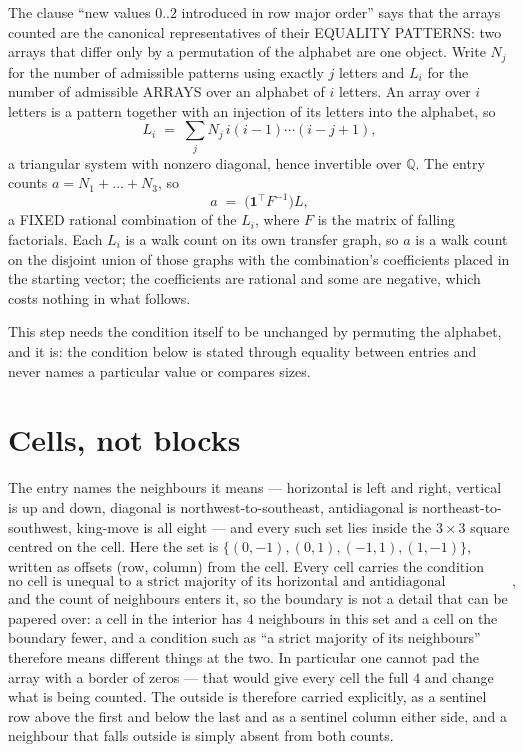 \documentclass[11pt,a4paper]{article}
\theoremstyle{plain}
\theoremstyle{definition}
\begin{document}
The clause ``new values $0..2$ introduced in row major order'' says that the arrays
counted are the canonical representatives of their EQUALITY PATTERNS: two arrays that differ
only by a permutation of the alphabet are one object. Write $N_j$ for the number of admissible
patterns using exactly $j$ letters and $L_i$ for the number of admissible ARRAYS over an
alphabet of $i$ letters. An array over $i$ letters is a pattern together with an injection of
its letters into the alphabet, so
\[
L_i\;=\;\sum_{j}N_j\,i(i-1)\cdots(i-j+1),
\]
a triangular system with nonzero diagonal, hence invertible over $\mathbb{Q}$. The entry
counts $a=N_1+\dots+N_{3}$, so
\[
a\;=\;\bigl(\mathbf{1}^{\!\top}F^{-1}\bigr)L ,
\]
a FIXED rational combination of the $L_i$, where $F$ is the matrix of falling factorials.
Each $L_i$ is a walk count on its own transfer graph, so $a$ is a walk count on the disjoint
union of those graphs with the combination's coefficients placed in the starting vector; the
coefficients are rational and some are negative, which costs nothing in what follows.

This step needs the condition itself to be unchanged by permuting the alphabet, and it is:
the condition below is stated through equality between entries and never names a particular
value or compares sizes.

\section{Cells, not blocks}

The entry names the neighbours it means --- horizontal is left and right, vertical is up and
down, diagonal is northwest-to-southeast, antidiagonal is northeast-to-southwest, king-move is
all eight --- and every such set lies inside the $3\times3$ square centred on the cell. Here
the set is $\{(0,-1), (0,1), (-1,1), (1,-1)\}$, written as offsets (row, column) from the cell. Every cell carries
the condition
\[
\text{no cell is unequal to a strict majority of its horizontal and antidiagonal neighbours},
\]
and the count of neighbours enters it, so the boundary is not a detail that can be papered
over: a cell in the interior has $4$ neighbours in this set and a cell on the boundary
fewer, and a condition such as ``a strict majority of its neighbours'' therefore means
different things at the two. In particular one cannot pad the array with a border of zeros ---
that would give every cell the full $4$ and change what is being counted. The outside is
therefore carried
explicitly, as a sentinel row above the first and below the last and as a sentinel column
either side, and a neighbour that falls outside is simply absent from both counts.
\end{document}
